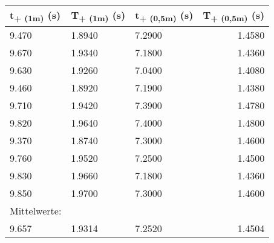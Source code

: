 \documentclass[titlepage=firstcover, captions=tableheading]{scrartcl}
\begin{document}
\begin{minipage}{\linewidth}
    \centering
    \begin{tabular}{lllr}
        \toprule
        t\textsubscript{+ (1m)} (s) & T\textsubscript{+ (1m)} (s) 
        & t\textsubscript{+ (0,5m)} (s) & T\textsubscript{+ (0,5m)} (s) \\
        \midrule
        9.470 & 1.8940 & 7.2900 & 1.4580 \\
        9.670 & 1.9340 & 7.1800 & 1.4360 \\
        9.630 & 1.9260 & 7.0400 & 1.4080 \\
        9.460 & 1.8920 & 7.1900 & 1.4380 \\
        9.710 & 1.9420 & 7.3900 & 1.4780 \\
        9.820 & 1.9640 & 7.4000 & 1.4800 \\
        9.370 & 1.8740 & 7.3000 & 1.4600 \\
        9.760 & 1.9520 & 7.2500 & 1.4500 \\
        9.830 & 1.9660 & 7.1800 & 1.4360 \\
        9.850 & 1.9700 & 7.3000 & 1.4600 \\
        \midrule
        Mittelwerte:\\
        9.657 & 1.9314 & 7.2520 & 1.4504\\
        
        \bottomrule
        
    \end{tabular}
    \label{tab:3}
\end{minipage}
\end{document}
